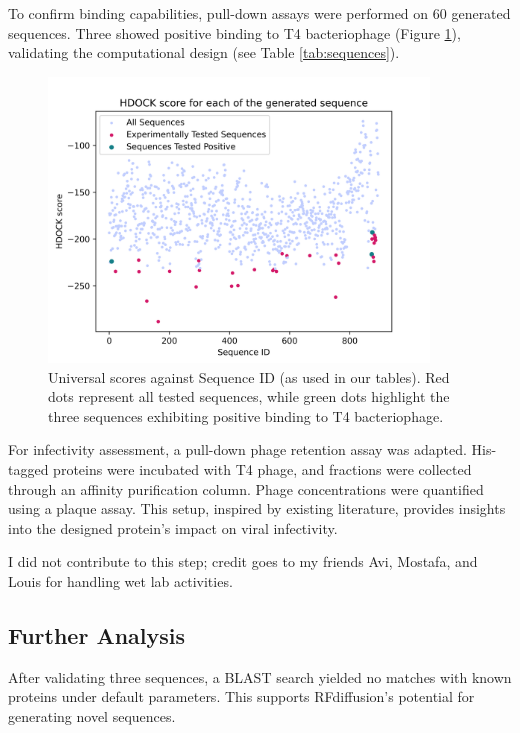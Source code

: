 \documentclass[11pt,a4paper]{article}
\begin{document}
To confirm binding capabilities, pull-down assays were performed on 60 generated sequences. Three showed positive binding to T4 bacteriophage (Figure \ref{fig:universal_score}), validating the computational design (see Table \ref{tab:sequences}). 

\begin{figure}[ht]
    \centering
    \includegraphics[width=0.9\textwidth]{Supplementary Data/Figures/universal_score_against_Sequence_Global_ID.png}
    \caption{Universal scores against Sequence ID (as used in our tables). Red dots represent all tested sequences, while green dots highlight the three sequences exhibiting positive binding to T4 bacteriophage.}
    \label{fig:universal_score}
\end{figure}

For infectivity assessment, a pull-down phage retention assay was adapted. His-tagged proteins were incubated with T4 phage, and fractions were collected through an affinity purification column. Phage concentrations were quantified using a plaque assay. This setup, inspired by existing literature, provides insights into the designed protein's impact on viral infectivity.

I did not contribute to this step; credit goes to my friends Avi, Mostafa, and Louis for handling wet lab activities.

\subsection{Further Analysis}

After validating three sequences, a BLAST search yielded no matches with known proteins under default parameters. This supports RFdiffusion's potential for generating novel sequences.
\end{document}
